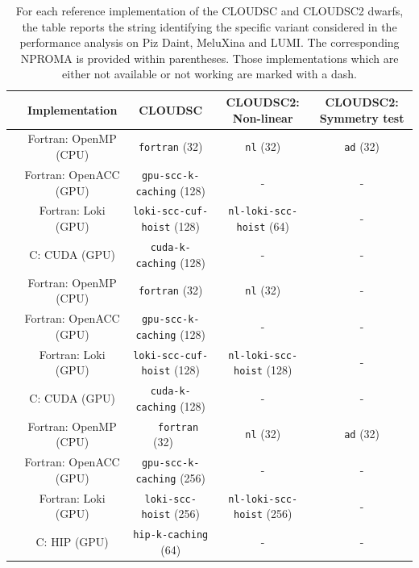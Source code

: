 \documentclass[gmd,manuscript,online]{copernicus}
\begin{document}
	\begin{table}[t!]
		\renewcommand{\arraystretch}{1.4}
		\centering
		\begin{footnotesize}
			\begin{tabular}{|c|c|c|c|c|}
				\hline
				& \textbf{Implementation} & \textbf{CLOUDSC} & \textbf{CLOUDSC2: Non-linear} & \textbf{CLOUDSC2: Symmetry test} \\
				\hline
				\multirow{4}{*}{\rotatebox[origin=c]{90}{\textbf{Piz Daint}}} & Fortran: OpenMP (CPU) & \texttt{fortran} (32) & \texttt{nl} (32) & \texttt{ad} (32) \\
				& Fortran: OpenACC (GPU) & \texttt{gpu-scc-k-caching} (128) & - & - \\
				& Fortran: Loki (GPU) & \texttt{loki-scc-cuf-hoist} (128) & \texttt{nl-loki-scc-hoist} (64) & - \\
				& C: CUDA (GPU) & \texttt{cuda-k-caching} (128) & - & - \\
				\hline
				\multirow{4}{*}{\rotatebox[origin=c]{90}{\textbf{MeluXina}}} & Fortran: OpenMP (CPU) & \texttt{fortran} (32) & \texttt{nl} (32) & - \\
				& Fortran: OpenACC (GPU) & \texttt{gpu-scc-k-caching} (128) & - & - \\
				& Fortran: Loki (GPU) & \texttt{loki-scc-cuf-hoist} (128) & \texttt{nl-loki-scc-hoist} (128) & - \\
				& C: CUDA (GPU) & \texttt{cuda-k-caching} (128) & - & - \\
				\hline
				\multirow{4}{*}{\rotatebox[origin=c]{90}{\textbf{LUMI}}} & Fortran: OpenMP (CPU) & ~~ \texttt{fortran} (32) ~~ & \texttt{nl} (32) & \texttt{ad} (32) \\
				& Fortran: OpenACC (GPU) & \texttt{gpu-scc-k-caching} (256) & - & - \\
				& Fortran: Loki (GPU) & \texttt{loki-scc-hoist} (256) & \texttt{nl-loki-scc-hoist} (256) & - \\
				& C: HIP (GPU) & \texttt{hip-k-caching} (64) & - & - \\
				\hline
			\end{tabular}
		\end{footnotesize}
		\vspace*{0.2cm}
		\caption{For each reference implementation of the CLOUDSC and CLOUDSC2 dwarfs, the table reports the string identifying the specific variant considered in the performance analysis on Piz Daint, MeluXina and LUMI. The corresponding NPROMA is provided within parentheses. Those implementations which are either not available or not working are marked with a dash.}
		\label{tab:versions}
	\end{table}
\end{document}
